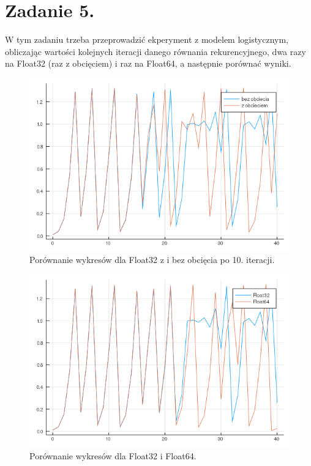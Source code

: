 \documentclass{article}
\begin{document}
\section{Zadanie 5.}
W tym zadaniu trzeba przeprowadzić ekperyment z modelem logistycznym, obliczając wartości kolejnych iteracji danego równania rekurencyjnego, dwa razy na Float32 (raz z obcięciem) i raz na Float64, a następnie porównać wyniki.
\begin{figure}[H]
	\includegraphics[width=\linewidth]{zad5_1.png}
	\caption{Porównanie wykresów dla Float32 z i bez obcięcia po 10. iteracji.}
	\label{fig:cut}
\end{figure}
\begin{figure}[H]
	\includegraphics[width=\linewidth]{zad5_2.png}
	\caption{Porównanie wykresów dla Float32 i Float64.}
	\label{fig:floats}
\end{figure}
\end{document}

